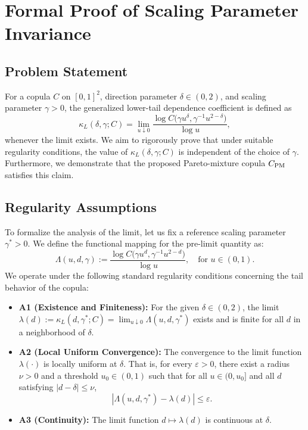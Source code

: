 \documentclass{article}
\begin{document}
\section*{Formal Proof of Scaling Parameter Invariance}

\subsection*{Problem Statement}
For a copula $C$ on $[0,1]^2$, direction parameter $\delta\in(0,2)$, and scaling parameter $\gamma>0$, the generalized lower-tail dependence coefficient is defined as
\[
\kappa_L(\delta,\gamma;C) = \lim_{u\downarrow 0} \frac{\log C\!\bigl(\gamma u^\delta,\gamma^{-1}u^{2-\delta}\bigr)}{\log u},
\]
whenever the limit exists. We aim to rigorously prove that under suitable regularity conditions, the value of $\kappa_L(\delta,\gamma;C)$ is independent of the choice of $\gamma$. Furthermore, we demonstrate that the proposed Pareto-mixture copula $C_{\rm PM}$ satisfies this claim.

\subsection*{Regularity Assumptions}
To formalize the analysis of the limit, let us fix a reference scaling parameter $\gamma^* > 0$. We define the functional mapping for the pre-limit quantity as:
\[
\Lambda(u, d, \gamma) := \frac{\log C\!\bigl(\gamma u^d,\gamma^{-1}u^{2-d}\bigr)}{\log u}, \quad \text{for } u \in (0,1).
\]
We operate under the following standard regularity conditions concerning the tail behavior of the copula:

\begin{itemize}[noitemsep,topsep=4pt]
    \item \textbf{A1 (Existence and Finiteness):} For the given $\delta \in (0,2)$, the limit $\lambda(d) := \kappa_L(d, \gamma^*; C) = \lim_{u\downarrow 0} \Lambda(u, d, \gamma^*)$ exists and is finite for all $d$ in a neighborhood of $\delta$.
    \item \textbf{A2 (Local Uniform Convergence):} The convergence to the limit function $\lambda(\cdot)$ is locally uniform at $\delta$. That is, for every $\varepsilon > 0$, there exist a radius $\nu > 0$ and a threshold $u_0 \in (0,1)$ such that for all $u \in (0, u_0]$ and all $d$ satisfying $|d - \delta| \le \nu$, 
    \[
    |\Lambda(u, d, \gamma^*) - \lambda(d)| \le \varepsilon.
    \]
    \item \textbf{A3 (Continuity):} The limit function $d \mapsto \lambda(d)$ is continuous at $\delta$.
\end{itemize}
\end{document}
